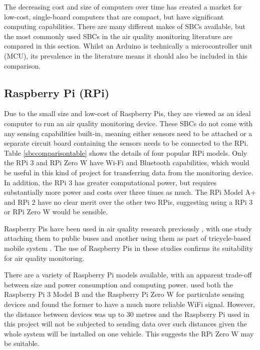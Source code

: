 \documentclass[11pt]{report}
\begin{document}

The decreasing cost and size of computers over time has created a market for low-cost, single-board computers that are compact, but have significant computing capabilities. There are many different makes of SBCs available, but the most commonly used SBCs in the air quality monitoring literature are compared in this section. Whilst an Arduino is technically a microcontroller unit (MCU), its prevalence in the literature means it should also be included in this comparison.


\subsection{Raspberry Pi (RPi)}

Due to the small size and low-cost of Raspberry Pis, they are viewed as an ideal computer to run an air quality monitoring device. These SBCs do not come with any sensing capabilities built-in, meaning either sensors need to be attached or a separate circuit board containing the sensors needs to be connected to the RPi. Table \ref{sbccomparisontable} shows the details of four popular RPi models. Only the RPi 3 and RPi Zero W have Wi-Fi and Bluetooth capabilities, which would be useful in this kind of project for transferring data from the monitoring device. In addition, the RPi 3 has greater computational power, but requires substantially more power and costs over three times as much. The RPi Model A+ and RPi 2 have no clear merit over the other two RPis, suggesting using a RPi 3 or RPi Zero W would be sensible.

Raspberry Pis have been used in air quality research previously \citep{ibrahim2015IOTenvmon,Balasubramaniyan2016AQMS_RPi,Rahman2017adaptivesensingRPi,thorpe2017RPimesh,alkandari2018airqualityexperimental}, with one study attaching them to public buses \citep{2014busairqualityVSN} and another using them as part of tricycle-based mobile system \citep{Jabbar2017bikefossarchitecture}. The use of Raspberry Pis in these studies confirms its suitability for air quality monitoring.

There are a variety of Raspberry Pi models available, with an apparent trade-off between size and power consumption and computing power. \cite{thorpe2017RPimesh} used both the Raspberry Pi 3 Model B and the Raspberry Pi Zero W for particulate sensing devices and found the former to have a much more reliable WiFi signal. However, the distance between devices was up to 30 metres and the Raspberry Pi used in this project will not be subjected to sending data over such distances given the whole system will be installed on one vehicle. This suggests the RPi Zero W may be suitable.
   
\end{document}
